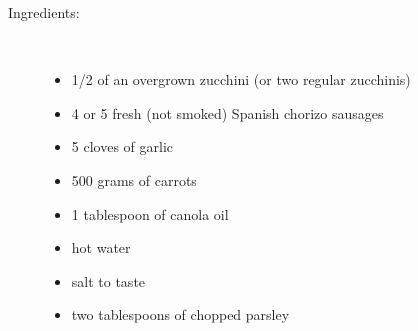 \documentclass[11pt,letterpaper]{article}
\begin{document}
\begin{description}

\item[Ingredients:]\ \\
	\begin{itemize}
	\item 1/2 of an overgrown zucchini (or two regular zucchinis)
	\item 4 or 5 fresh (not smoked) Spanish chorizo sausages
	\item 5 cloves of garlic
	\item 500 grams of carrots
	\item 1 tablespoon of canola oil
	\item hot water
	\item salt to taste 
	\item  two tablespoons of chopped parsley
	\end{itemize}


\end{description}
\end{document}
